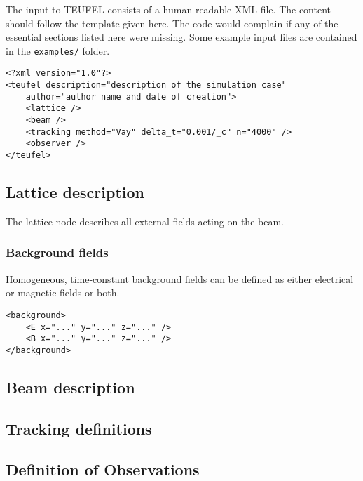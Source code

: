 \documentclass[11pt]{article}
\begin{document}
The input to TEUFEL consists of a human readable XML file. The content should follow
the template given here. The code would complain if any of the essential sections
listed here were missing. Some example input files are contained in the \verb|examples/| folder.

\begin{lstlisting}
<?xml version="1.0"?>
<teufel description="description of the simulation case"
    author="author name and date of creation">
    <lattice />
    <beam />
    <tracking method="Vay" delta_t="0.001/_c" n="4000" />
    <observer />
</teufel>
\end{lstlisting}

\subsection{Lattice description}

The lattice node describes all external fields acting on the beam.

\subsubsection{Background fields}
Homogeneous, time-constant background fields can be defined as either electrical or magnetic
fields or both.
\begin{lstlisting}
<background>
    <E x="..." y="..." z="..." />
    <B x="..." y="..." z="..." />
</background>
\end{lstlisting}


\subsection{Beam description}


\subsection{Tracking definitions}


\subsection{Definition of Observations}

\end{document}
